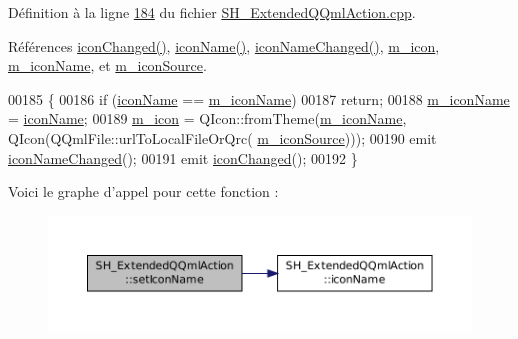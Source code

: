 Définition à la ligne \hyperlink{SH__ExtendedQQmlAction_8cpp_source_l00184}{184} du fichier \hyperlink{SH__ExtendedQQmlAction_8cpp_source}{S\-H\-\_\-\-Extended\-Q\-Qml\-Action.\-cpp}.



Références \hyperlink{classSH__ExtendedQQmlAction_adb8e4632768121ebabc5a402f6307c8d}{icon\-Changed()}, \hyperlink{classSH__ExtendedQQmlAction_afaa301943c53a8689ec5447560ffc97f}{icon\-Name()}, \hyperlink{classSH__ExtendedQQmlAction_a32deffc45767f5c61949c445ca018156}{icon\-Name\-Changed()}, \hyperlink{classSH__ExtendedQQmlAction_a4386f56e28c2c70cfedd16c1d8c2c4a4}{m\-\_\-icon}, \hyperlink{classSH__ExtendedQQmlAction_a3375d1504e5ec862ed05500bf529d95c}{m\-\_\-icon\-Name}, et \hyperlink{classSH__ExtendedQQmlAction_a61c8633eab1fa3b69752074220e785fc}{m\-\_\-icon\-Source}.


\begin{DoxyCode}
00185 \{
00186     \textcolor{keywordflow}{if} (\hyperlink{classSH__ExtendedQQmlAction_afaa301943c53a8689ec5447560ffc97f}{iconName} == \hyperlink{classSH__ExtendedQQmlAction_a3375d1504e5ec862ed05500bf529d95c}{m\_iconName})
00187         \textcolor{keywordflow}{return};
00188     \hyperlink{classSH__ExtendedQQmlAction_a3375d1504e5ec862ed05500bf529d95c}{m\_iconName} = \hyperlink{classSH__ExtendedQQmlAction_afaa301943c53a8689ec5447560ffc97f}{iconName};
00189     \hyperlink{classSH__ExtendedQQmlAction_a4386f56e28c2c70cfedd16c1d8c2c4a4}{m\_icon} = QIcon::fromTheme(\hyperlink{classSH__ExtendedQQmlAction_a3375d1504e5ec862ed05500bf529d95c}{m\_iconName}, QIcon(QQmlFile::urlToLocalFileOrQrc(
      \hyperlink{classSH__ExtendedQQmlAction_a61c8633eab1fa3b69752074220e785fc}{m\_iconSource})));
00190     emit \hyperlink{classSH__ExtendedQQmlAction_a32deffc45767f5c61949c445ca018156}{iconNameChanged}();
00191     emit \hyperlink{classSH__ExtendedQQmlAction_adb8e4632768121ebabc5a402f6307c8d}{iconChanged}();
00192 \}
\end{DoxyCode}


Voici le graphe d'appel pour cette fonction \-:\nopagebreak
\begin{figure}[H]
\begin{center}
\leavevmode
\includegraphics[width=350pt]{classSH__ExtendedQQmlAction_a348526d65cd47b4ea6378e2a62065135_cgraph}
\end{center}
\end{figure}


